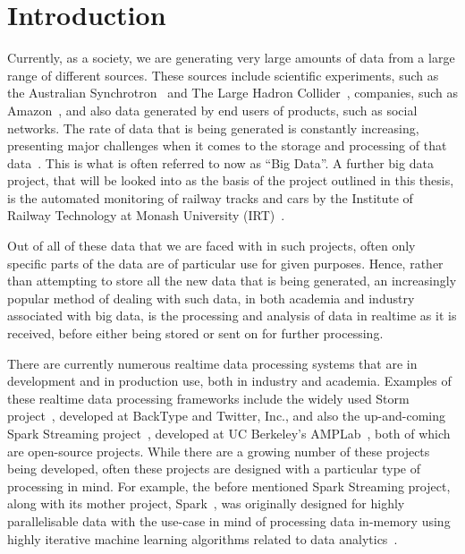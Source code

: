 \chapter{Introduction}
\label{sec:intro}

Currently, as a society, we are generating very large amounts of data from a large range of different sources. These
sources include scientific experiments, such as the Australian Synchrotron~\cite{web:synchrotron} and The Large Hadron
Collider~\cite{web:LHC}, companies, such as Amazon~\cite{web:Amazon}, and also data generated by end users of products,
such as social networks. The rate of data that is being generated is constantly increasing, presenting major challenges
when it comes to the storage and processing of that data~\cite{bohlouli_towards_2013}. This is what is often referred to
now as ``Big Data''. A further big data project, that will be looked into as the basis of the project outlined in this
thesis, is the automated monitoring of railway tracks and cars by the Institute of Railway Technology at Monash University
(IRT)~\cite{web:monash_irt}.

Out of all of these data that we are faced with in such projects, often only specific parts of the data are of particular use for given
purposes. Hence, rather than attempting to store all the new data that is being generated, an increasingly popular method of
dealing with such data, in both academia and industry associated with big data, is the processing and analysis of
data in realtime as it is received, before either being stored or sent on for further processing.

There are currently numerous realtime data processing systems that are in development and in production use, both in
industry and academia. Examples of these realtime data processing frameworks include the widely used Storm
project~\cite{web:Storm}, developed at BackType and Twitter, Inc., and also the up-and-coming Spark Streaming
project~\cite{web:SparkStreaming}, developed at UC Berkeley's AMPLab~\cite{web:UCBerkelyAMCLab}, both of which are
open-source projects. While there are a growing number of these projects being developed, often these projects are designed
with a particular type of processing in mind. For example, the before
mentioned Spark Streaming project, along with its mother project, Spark~\cite{web:Spark}, was originally designed for highly
parallelisable data with the use-case in mind of processing data in-memory using highly iterative machine learning
algorithms related to data analytics~\cite{liu_survey_2014}.

